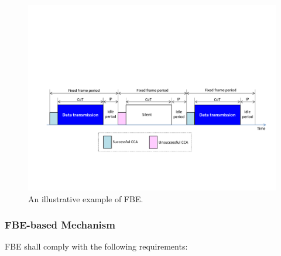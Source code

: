 \begin{figure}[!t]
	\centering
	\includegraphics[width=0.9\columnwidth]{figures2/FBE-example}
	\caption{An illustrative example of FBE.}
	\label{figs:FBE-example}
\end{figure}


\subsubsection{FBE-based Mechanism}
\label{etsi-lbt:fbe}

FBE shall comply with the following requirements:

